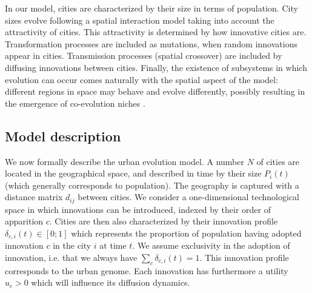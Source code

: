 \documentclass[letterpaper]{article}
\begin{document}
In our model, cities are characterized by their size in terms of population. City sizes evolve following a spatial interaction model taking into account the attractivity of cities. This attractivity is determined by how innovative cities are. Transformation processes are included as mutations, when random innovations appear in cities. Transmission processes (spatial crossover) are included by diffusing innovations between cities. Finally, the existence of subsystems in which evolution can occur comes naturally with the spatial aspect of the model: different regions in space may behave and evolve differently, possibly resulting in the emergence of co-evolution niches \citep{holland2012signals,raimbault2018co}.

\subsection{Model description}


 
We now formally describe the urban evolution model. A number $N$ of cities are located in the geographical space, and described in time by their size $P_i (t)$ (which generally corresponds to population). The geography is captured with a distance matrix $d_{ij}$ between cities. We consider a one-dimensional technological space in which innovations can be introduced, indexed by their order of apparition $c$. Cities are then also characterized by their innovation profile $\delta_{c,i} (t) \in \left[0;1\right]$ which represents the proportion of population having adopted innovation $c$ in the city $i$ at time $t$. We assume exclusivity in the adoption of innovation, i.e. that we always have $\sum_c \delta_{c,i} (t) = 1$. This innovation profile corresponds to the urban genome. Each innovation has furthermore a utility $u_c >0$ which will influence its diffusion dynamics.
\end{document}
